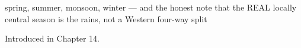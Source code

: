 \noindent\begin{minipage}[t]{\linewidth}
\raggedright
\textbf{       }\par
\small spring, summer, monsoon, winter — and the honest note that the REAL locally central season is the rains, not a Western four-way split\par
\footnotesize Introduced in Chapter 14.
\end{minipage}\par\medskip
